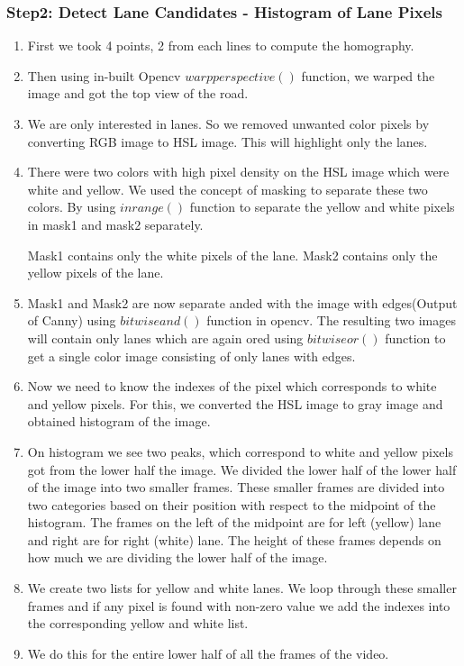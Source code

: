 \documentclass[12pt]{article}
\begin{document}
\subsubsection{Step2: Detect Lane Candidates - Histogram of Lane Pixels}
\begin{enumerate}
\item First we took 4 points, 2  from each lines to compute the homography.

\item Then using in-built Opencv $warpperspective()$ function, we warped the image and got the top view of the road.

\item We are only interested in lanes. So we removed unwanted color pixels by converting RGB image to HSL image. This will highlight only the lanes.

\item There were two colors with high pixel density on the HSL image which were white and yellow. We used the concept of masking to separate these two colors. By using $inrange()$ function to separate the yellow and white pixels in mask1 and mask2 separately.

Mask1 contains only the white pixels of the lane.
Mask2 contains only the yellow pixels of the lane.

\item Mask1 and Mask2 are now separate anded with the image with edges(Output of Canny) using $bitwiseand()$ function in opencv. The resulting two images will contain only lanes which are again ored using $bitwiseor()$ function to get a single color image consisting of only lanes with edges. 

\item Now we need to know the indexes of the pixel which corresponds to white and yellow pixels. For this, we converted the HSL image to gray image and obtained histogram of the image.

\item On histogram we see two peaks, which correspond to white and yellow pixels got from the lower half the image. We divided the lower half of the lower half of the image into two smaller frames. These smaller frames are divided into two categories based on their position with respect to the midpoint of the histogram. The frames on the left of the midpoint are for left (yellow) lane and right are for right (white) lane. The height of these frames depends on how much we are dividing the lower half of the image.

\item We create two lists for yellow and white lanes. We loop through these smaller frames and if any pixel is found with non-zero value we add the indexes into the corresponding yellow and white list.

\item We do this for the entire lower half of all the frames of the video.

\end{enumerate}
\end{document}
